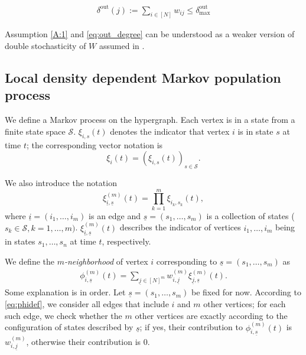 \documentclass{article}
\newcommand{\ul}{\underline}
\newcommand{\1}[1]{{\mathds{1}}_{\left\{#1\right\}}}
\renewcommand{\S}{\mathcal{S}}
\begin{document}
	\begin{align}
		\label{eq:out_degree}
		\delta^{\textrm{out}}(j):=\sum_{i \in  [N]} w_{ij} \leq \delta_{\textrm{max}}^{\textrm{out}}
	\end{align}
	 
 	Assumption \eqref{A:1} and \eqref{eq:out_degree} can be understood as a weaker version of double stochasticity of $W$ assumed in \cite{Sridhar_Kar1, Sridhar_Kar2}.
	
	
	
	
	
	\subsection{Local density dependent Markov population process}
	\label{s:Markov}
	
	We define a Markov process on the hypergraph. Each vertex is in a state from a finite state space $\S$. $\xi_{i,s}(t)$ denotes the indicator that vertex $i$ is in state $s$ at time $t$; the corresponding vector notation is
	$$\xi_i(t)=\left(\xi_{i,s}(t)\right)_{s \in \S}.$$
	
	We also introduce the notation
	$$\xi^{(m)}_{\ul{i},\ul{s}}(t)=\prod_{k=1}^m \xi_{i_k,s_k}(t),$$
	where $\ul{i}=(i_1,\dots,i_{m})$ is an edge and $\ul{s}=(s_1,\dots,s_{m})$ is a collection of states ($s_k\in \S,k=1,\dots,m)$. $\xi^{(m)}_{\ul{i},\ul{s}}(t)$ describes the indicator of vertices $i_1,\dots, i_m$ being in states $s_1,\dots,s_n$ at time $t$, respectively.
	
	We define the \emph{$m$-neighborhood} of vertex $i$ corresponding to $\ul{s}=(s_1,\dots,s_{m})$ as
	\begin{align}
		\label{eq:phidef}
		\phi^{(m)}_{i,\ul{s}}(t) = \sum_{\ul{j}\in [N]^m} w^{(m)}_{i,\ul{j}}\xi^{(m)}_{\ul{j},\ul{s}}(t).
	\end{align}
	Some explanation is in order. Let $\ul{s}=(s_1,\dots,s_{m})$ be fixed for now. According to \eqref{eq:phidef}, we consider all edges that include $i$ and $m$ other vertices; for each such edge, we check whether the $m$ other vertices are exactly according to the configuration of states described by $\ul{s}$; if yes, their contribution to $\phi^{(m)}_{i,\ul{s}}(t)$ is $w^{(m)}_{i,\ul{j}}$, otherwise their contribution is 0.
	
\end{document}
